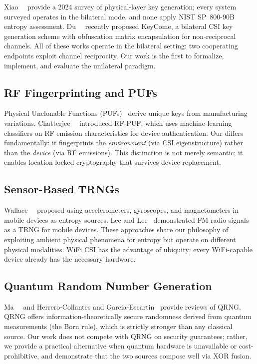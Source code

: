 Xiao~\etal~\cite{xiao2024securing} provide a 2024 survey of physical-layer key generation; every system surveyed operates in the bilateral mode, and none apply NIST SP~800-90B entropy assessment.
Du~\etal~\cite{du2024keycome} recently proposed KeyCome, a bilateral CSI key generation scheme with obfuscation matrix encapsulation for non-reciprocal channels.
All of these works operate in the bilateral setting: two cooperating endpoints exploit channel reciprocity.
Our work is the first to formalize, implement, and evaluate the unilateral paradigm.

\subsection{RF Fingerprinting and PUFs}
\label{subsec:related-puf}

Physical Unclonable Functions (PUFs)~\cite{suh2007puf} derive unique keys from manufacturing variations.
Chatterjee~\etal~\cite{chatterjee2019rfpuf} introduced RF-PUF, which uses machine-learning classifiers on RF emission characteristics for device authentication.
Our \puek differs fundamentally: it fingerprints the \emph{environment} (via CSI eigenstructure) rather than the \emph{device} (via RF emissions).
This distinction is not merely semantic; it enables location-locked cryptography that survives device replacement.

\subsection{Sensor-Based TRNGs}
\label{subsec:related-trng}

Wallace~\etal~\cite{wallace2016sensortrng} proposed using accelerometers, gyroscopes, and magnetometers in mobile devices as entropy sources.
Lee and Lee~\cite{lee2019fmtrng} demonstrated FM radio signals as a TRNG for mobile devices.
These approaches share our philosophy of exploiting ambient physical phenomena for entropy but operate on different physical modalities.
WiFi CSI has the advantage of ubiquity: every WiFi-capable device already has the necessary hardware.

\subsection{Quantum Random Number Generation}
\label{subsec:related-qrng}

Ma~\etal~\cite{ma2016qrng} and Herrero-Collantes and Garcia-Escartin~\cite{herrero2017qrng} provide reviews of QRNG.
QRNG offers information-theoretically secure randomness derived from quantum measurements (the Born rule), which is strictly stronger than any classical source.
Our work does not compete with QRNG on security guarantees; rather, we provide a practical alternative when quantum hardware is unavailable or cost-prohibitive, and demonstrate that the two sources compose well via XOR fusion.

